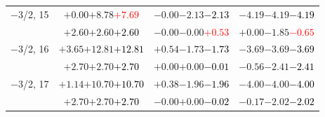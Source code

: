\documentclass[compress]{beamer}
\begin{document}
\begin{frame}
\begin{tabular}{r | c | c | c}
$-$3/2, 15 & $+0.00$\hspace{0.1 cm}$+8.78$\hspace{0.1 cm}\textcolor{red}{$+7.69$} & $-0.00$\hspace{0.1 cm}$-2.13$\hspace{0.1 cm}\textcolor{black}{$-2.13$} & $-4.19$\hspace{0.1 cm}$-4.19$\hspace{0.1 cm}\textcolor{black}{$-4.19$} \\
           & $+2.60$\hspace{0.1 cm}$+2.60$\hspace{0.1 cm}\textcolor{black}{$+2.60$} & $-0.00$\hspace{0.1 cm}$-0.00$\hspace{0.1 cm}\textcolor{red}{$+0.53$} & $+0.00$\hspace{0.1 cm}$-1.85$\hspace{0.1 cm}\textcolor{red}{$-0.65$} \\
$-$3/2, 16 & $+3.65$\hspace{0.1 cm}$+12.81$\hspace{0.1 cm}\textcolor{black}{$+12.81$} & $+0.54$\hspace{0.1 cm}$-1.73$\hspace{0.1 cm}\textcolor{black}{$-1.73$} & $-3.69$\hspace{0.1 cm}$-3.69$\hspace{0.1 cm}\textcolor{black}{$-3.69$} \\
           & $+2.70$\hspace{0.1 cm}$+2.70$\hspace{0.1 cm}\textcolor{black}{$+2.70$} & $+0.00$\hspace{0.1 cm}$+0.00$\hspace{0.1 cm}\textcolor{black}{$-0.01$} & $-0.56$\hspace{0.1 cm}$-2.41$\hspace{0.1 cm}\textcolor{black}{$-2.41$} \\
$-$3/2, 17 & $+1.14$\hspace{0.1 cm}$+10.70$\hspace{0.1 cm}\textcolor{black}{$+10.70$} & $+0.38$\hspace{0.1 cm}$-1.96$\hspace{0.1 cm}\textcolor{black}{$-1.96$} & $-4.00$\hspace{0.1 cm}$-4.00$\hspace{0.1 cm}\textcolor{black}{$-4.00$} \\
           & $+2.70$\hspace{0.1 cm}$+2.70$\hspace{0.1 cm}\textcolor{black}{$+2.70$} & $-0.00$\hspace{0.1 cm}$+0.00$\hspace{0.1 cm}\textcolor{black}{$-0.02$} & $-0.17$\hspace{0.1 cm}$-2.02$\hspace{0.1 cm}\textcolor{black}{$-2.02$} \\

\end{tabular}
\end{frame}
\end{document}
